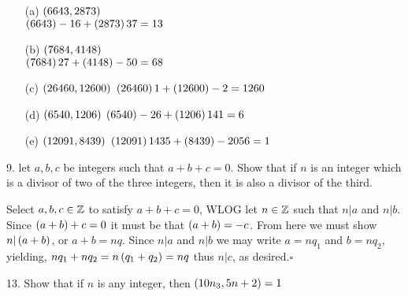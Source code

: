 \begin{mdframed}[style=darkAnswer,frametitle={Joe Starr}]
\begin{itemize}
    \item [(a)] {$\left(6643,2873\right)$\\
        $\left(6643\right)-16+\left(2873\right)37=13$
    }
    \item [(b)] {$\left(7684,4148\right)$\\
    $\left(7684\right)27+\left(4148\right)-50=68$
    }
    \item [(c)] {$\left(26460,12600\right)$
    $\left(26460\right)1+\left(12600\right)-2=1260$
    }
    \item [(d)] {$\left(6540,1206\right)$
   $\left(6540\right)-26+\left(1206\right)141=6$
    }
    \item [(e)] {$\left(12091,8439\right)$
    $\left(12091\right)1435+\left(8439\right)-2056=1$
    }
\end{itemize}
\end{mdframed}
\newpage
\begin{mdframed}[style=darkQuesion]
9.  let $a,b,c$ be integers such that $a+b+c=0$. Show that if $n$ is an integer
which is a divisor of two of the three integers, then it is also a divisor of 
the third. 

\end{mdframed}

\begin{mdframed}[style=darkAnswer,frametitle={Joe Starr}]
Select $a,b,c\in \mathbb{Z}$ to satisfy $a+b+c=0$, WLOG let $n\in \mathbb{Z}$ such that 
$n\vert a$ and $n\vert b$. Since $\left(a+b\right)+c=0$ it must be that $\left(a+b\right)=-c$.
From here we must show $n\vert\left(a+b\right)$, or $a+b=nq$. Since $n\vert a$ and 
$n\vert b$ we may write $a=nq_1$ and $b=nq_2$, yielding, 
$nq_1+nq_2=n\left(q_1+q_2\right)=nq$ thus $n\vert c$, as desired.$\square$ 
\end{mdframed}
\newpage
\begin{mdframed}[style=darkQuesion]
13.  Show that if $n$ is any integer, then $\left(10n_3,5n+2\right)=1$
\end{mdframed}

